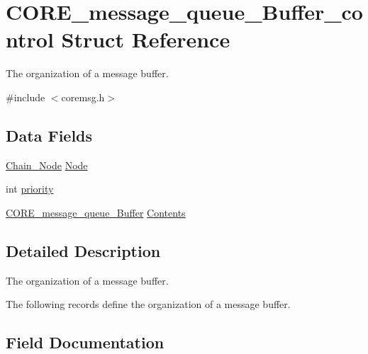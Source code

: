 \hypertarget{structCORE__message__queue__Buffer__control}{}\section{C\+O\+R\+E\+\_\+message\+\_\+queue\+\_\+\+Buffer\+\_\+control Struct Reference}
\label{structCORE__message__queue__Buffer__control}


The organization of a message buffer.  




{\ttfamily \#include $<$coremsg.\+h$>$}

\subsection*{Data Fields}
\begin{DoxyCompactItemize}
\item 
\mbox{\hyperlink{group__RTEMSScoreChain_ga0dd4bfcca1ac7f90de2842e447846d3d}{Chain\+\_\+\+Node}} \mbox{\hyperlink{structCORE__message__queue__Buffer__control_a340d227743eb3d5913cfaae11f0053d2}{Node}}
\item 
int \mbox{\hyperlink{structCORE__message__queue__Buffer__control_af9e844de530444d5580fb92870ae0c5c}{priority}}
\item 
\mbox{\hyperlink{structCORE__message__queue__Buffer}{C\+O\+R\+E\+\_\+message\+\_\+queue\+\_\+\+Buffer}} \mbox{\hyperlink{structCORE__message__queue__Buffer__control_a2a5caf2aff227389162702ea7bef5015}{Contents}}
\end{DoxyCompactItemize}


\subsection{Detailed Description}
The organization of a message buffer. 

The following records define the organization of a message buffer. 

\subsection{Field Documentation}
\mbox{\label{structCORE__message__queue__Buffer__control_a2a5caf2aff227389162702ea7bef5015}} 
